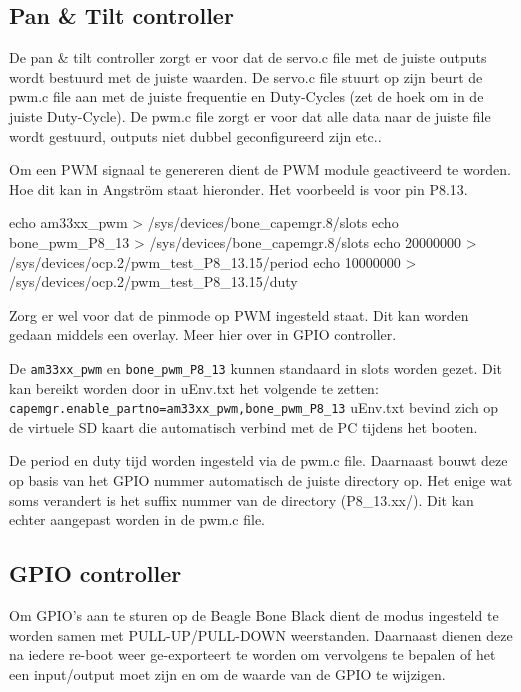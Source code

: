 \subsection{Pan \& Tilt controller}
\label{sub:panTiltContr}
De pan \& tilt controller zorgt er voor dat de servo.c file met de juiste outputs
wordt bestuurd met de juiste waarden. De servo.c file stuurt op zijn beurt de pwm.c
file aan met de juiste frequentie en Duty-Cycles (zet de hoek om in de juiste
Duty-Cycle). De pwm.c file zorgt er voor dat alle data naar de juiste file wordt
gestuurd, outputs niet dubbel geconfigureerd zijn etc..

Om een PWM signaal te genereren dient de PWM module geactiveerd te worden. Hoe
dit kan in Angström staat hieronder. Het voorbeeld is voor pin P8.13.

\begin{cppcode}
echo am33xx_pwm > /sys/devices/bone_capemgr.8/slots
echo bone_pwm_P8_13 > /sys/devices/bone_capemgr.8/slots
echo 20000000 > /sys/devices/ocp.2/pwm_test_P8_13.15/period
echo 10000000 > /sys/devices/ocp.2/pwm_test_P8_13.15/duty
\end{cppcode}


Zorg er wel voor dat de pinmode op PWM ingesteld staat. Dit kan worden gedaan
middels een overlay. Meer hier over in GPIO controller.

De \texttt{am33xx\_pwm} en \texttt{bone\_pwm\_P8\_13} kunnen standaard in slots worden gezet. Dit kan
bereikt worden door in uEnv.txt het volgende te zetten:
\texttt{capemgr.enable\_partno=am33xx\_pwm,bone\_pwm\_P8\_13}
uEnv.txt bevind zich op de virtuele SD kaart die automatisch verbind met de PC
tijdens het booten.

De period en duty tijd worden ingesteld via de pwm.c file. Daarnaast bouwt deze op
basis van het GPIO nummer automatisch de juiste directory op. Het enige wat
soms verandert is het suffix nummer van de directory (P8\_13.xx/). Dit kan echter
aangepast worden in de pwm.c file.

\subsection{GPIO controller}
\label{sub:gpiocontr}
Om GPIO's aan te sturen op de Beagle Bone Black dient de modus ingesteld te worden
samen met PULL-UP/PULL-DOWN weerstanden. Daarnaast dienen deze na iedere re-boot
weer ge-exporteert te worden om vervolgens te bepalen of het een input/output moet
zijn en om de waarde van de GPIO te wijzigen.

